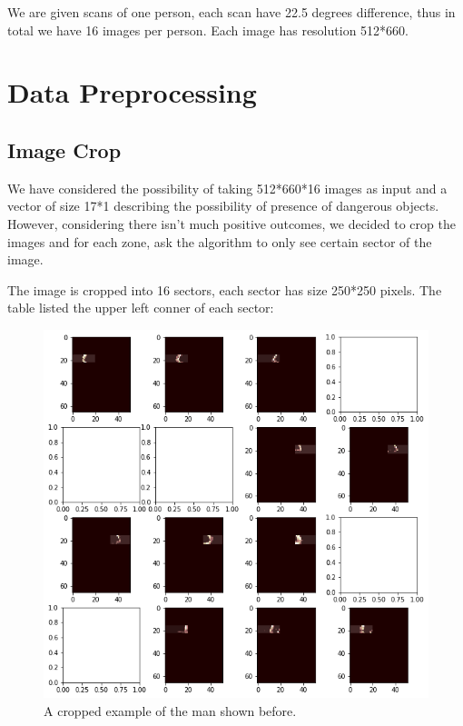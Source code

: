 \documentclass[conference,compsoc]{IEEEtran}
\begin{document}
	\par We are given scans of one person, each scan have 22.5 degrees difference, thus in total we have 16 images per person. Each image has resolution 512*660. 
	
\section{Data Preprocessing}
	\subsection{Image Crop}
		\par We have considered the possibility of taking 512*660*16 images as input and a vector of size 17*1 describing the possibility of presence of dangerous objects. However, considering there isn't much positive outcomes, we decided to crop the images and for each zone, ask the algorithm to only see certain sector of the image.
		\par The image is cropped into 16 sectors, each sector has size 250*250 pixels. The table listed the upper left conner of each sector:
		\begin{figure}[h] \label{cropped}
			\centering
			\includegraphics[width=0.9\linewidth]{./Pic/cropped}
			\caption{A cropped example of the man shown before.}
		\end{figure}
\end{document}
